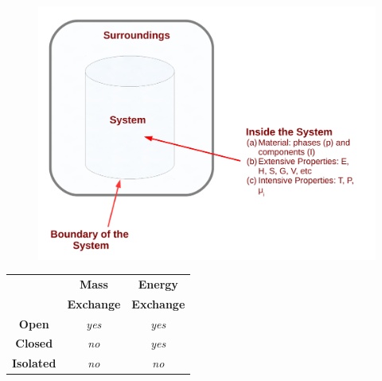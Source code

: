 \documentclass[10pt,compress,handout,ignorenonframetext]{beamer}
\begin{document}
\begin{frame}
\begin{columns}
\begin{column}[l]{0.4\linewidth}
\begin{figure}
\begin{center}
          \includegraphics[width=\columnwidth,clip]{./Pics/Fig_SystemDefinition}
        \end{center}
      \end{figure}
      \begin{tabular}{|c|c|c|}
         \hline
                      & {\bf Mass} & {\bf Energy} \\
                      & {\bf Exchange} & {\bf Exchange} \\
         \hline
         {\bf Open}   & {\it yes}  & {\it yes}    \\
         {\bf Closed} & {\it no}   & {\it yes}    \\
         {\bf Isolated}&{\it no}   & {\it no}     \\
         \hline 
      \end{tabular}    
    \end{column}
  \end{columns}
\end{frame}
\normalsize
\end{document}
